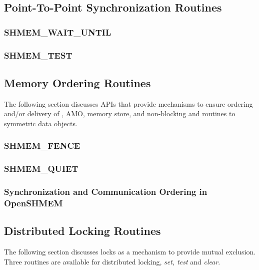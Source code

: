 \documentclass[10pt]{book}
\begin{document}
\subsection{Point-To-Point Synchronization Routines}\label{subsec:p2p_intro}


\subsubsection{\textbf{SHMEM\_WAIT\_UNTIL}}\label{subsec:shmem_wait_until}


\subsubsection{\textbf{SHMEM\_TEST}}\label{subsec:shmem_test}






\subsection{Memory Ordering Routines}\label{subsec:memory_order}
The following section discusses \openshmem \acp{API} that provide mechanisms to
ensure ordering and/or delivery of , \ac{AMO}, memory store,
and non-blocking \PUT{} and \GET{} routines to symmetric data objects.

\subsubsection{\textbf{SHMEM\_FENCE}}\label{subsec:shmem_fence}


\subsubsection{\textbf{SHMEM\_QUIET}}\label{subsec:shmem_quiet}


\subsubsection{Synchronization and Communication Ordering in OpenSHMEM}







\subsection{Distributed Locking Routines}
The following section discusses \openshmem locks as a mechanism to provide
mutual exclusion. Three routines are available for distributed locking,
\textit{set, test} and \textit{clear}.
\end{document}
